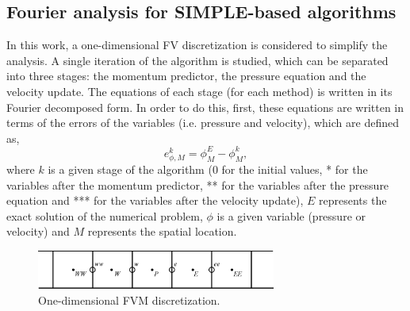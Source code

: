 \documentclass[final,3p,times,11pt,onecolumn]{myElsarticle}
\numberwithin{equation}{section}
\begin{document}
\subsection{Fourier analysis for SIMPLE-based algorithms}

In this work, a one-dimensional FV discretization is considered to simplify the analysis. A single iteration of the algorithm is studied, which can be separated into three stages: the momentum predictor, the pressure equation and the velocity update. The equations of each stage (for each method) is written in its Fourier decomposed form. In order to do this, first, these equations are written in terms of the errors of the variables (i.e. pressure and velocity), which are defined as,
\begin{equation}
    e^k_{\phi,M} = \phi^{E}_{M}-\phi_M^{k},
\end{equation}
where $k$ is a given stage of the algorithm ($0$ for the initial values, * for the variables after the momentum predictor, ** for the variables after the pressure equation and *** for the variables after the velocity update), $E$ represents the exact solution of the numerical problem, $\phi$ is a given variable (pressure or velocity) and $M$ represents the spatial location.
\begin{figure}[t!]
    \centering
    \includegraphics[width=0.7\textwidth]{fig/cells2.eps}
    \caption{One-dimensional FVM discretization.}
    \label{fig:4a}
\end{figure}
\end{document}
